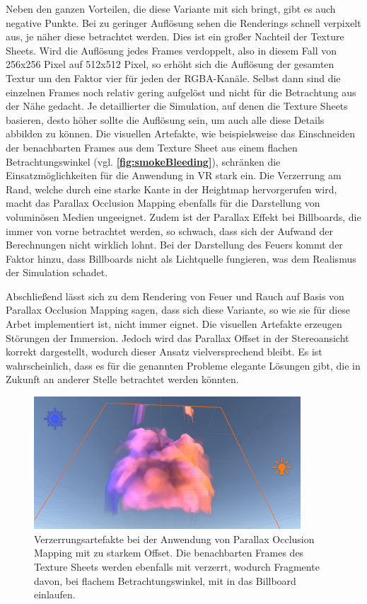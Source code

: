 Neben den ganzen Vorteilen, die diese Variante mit sich bringt, gibt es auch negative Punkte. Bei zu geringer Auflösung sehen die Renderings schnell
verpixelt aus, je näher diese betrachtet werden. Dies ist ein großer Nachteil der Texture Sheets. Wird die Auflösung jedes Frames verdoppelt, also in diesem
Fall von 256x256 Pixel auf 512x512 Pixel, so erhöht sich die Auflösung der gesamten Textur um den Faktor vier für jeden der RGBA-Kanäle. Selbst dann sind
die einzelnen Frames noch relativ gering aufgelöst und nicht für die Betrachtung aus der Nähe gedacht. Je detaillierter die Simulation, auf denen die Texture Sheets basieren,
desto höher sollte die Auflösung sein, um auch alle diese Details abbilden zu können.
Die visuellen Artefakte, wie beispielsweise das Einschneiden der benachbarten Frames aus dem Texture Sheet aus einem flachen Betrachtungswinkel (vgl. \textbf{\autoref{fig:smokeBleeding}}),
schränken die Einsatzmöglichkeiten für die Anwendung in VR stark ein. Die Verzerrung am Rand, welche durch eine starke Kante in der Heightmap hervorgerufen wird, macht das
Parallax Occlusion Mapping ebenfalls für die Darstellung von voluminösen Medien ungeeignet. Zudem ist der Parallax Effekt bei Billboards, die immer von vorne betrachtet werden, so schwach, 
dass sich der Aufwand der Berechnungen nicht wirklich lohnt. 
Bei der Darstellung des Feuers kommt der Faktor hinzu, dass Billboards nicht als Lichtquelle fungieren, was dem Realismus der Simulation schadet.

Abschließend lässt sich zu dem Rendering von Feuer und Rauch auf Basis von Parallax Occlusion Mapping sagen, dass sich diese Variante, so wie sie für diese Arbet
implementiert ist, nicht immer eignet. Die visuellen Artefakte erzeugen Störungen der Immersion. Jedoch wird das Parallax Offset in der Stereoansicht korrekt dargestellt,
wodurch dieser Ansatz vielversprechend bleibt. Es ist wahrscheinlich, dass es für die genannten Probleme elegante Lösungen gibt, die in Zukunft an anderer Stelle 
betrachtet werden könnten.


\begin{figure}[h!]
	\includegraphics[width=0.89\textwidth]{Grafiken/Evaluation/Smoke_artefacts.png}
	\centering
	\begin{footnotesize}
		\caption{Verzerrungsartefakte bei der Anwendung von Parallax Occlusion Mapping mit zu starkem Offset. Die benachbarten Frames des Texture Sheets
			werden ebenfalls mit verzerrt, wodurch Fragmente davon, bei flachem Betrachtungswinkel, mit in das Billboard einlaufen.}
		\label{fig:smokeBleeding}
	\end{footnotesize}
\end{figure}



